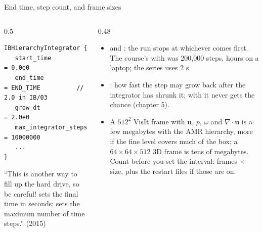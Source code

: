 \documentclass[aspectratio=169,11pt]{beamer}
\begin{document}
\begin{frame}[fragile]{End time, step count, and frame sizes}
\label{fr:outputs2}
\begin{columns}[T,onlytextwidth]
\begin{column}{0.5\textwidth}
\begin{lstlisting}[style=inputtiny]
IBHierarchyIntegrator {
   start_time           = 0.0e0
   end_time             = END_TIME          // 2.0 in IB/03
   grow_dt              = 2.0e0
   max_integrator_steps = 10000000
   ...
}
\end{lstlisting}
\footnotesize ``This is another way to fill up the hard drive, so be careful!  sets the final time in seconds;  sets the maximum number of time steps.'' (2015)
\end{column}
\begin{column}{0.48\textwidth}
\small
\begin{itemize}
  \item {} and : the run stops at whichever comes first. The course's  with  was 200,000 steps, hours on a laptop; the series uses 2 s.
  \item {}: how fast the step may grow back after the integrator has shrunk it; with  it never gets the chance (chapter 5).
  \item A $512^2$ VisIt frame with $\mathbf{u}$, $p$, $\omega$ and $\nabla\cdot\mathbf{u}$ is a few megabytes with the AMR hierarchy, more if the fine level covers much of the box; a $64\times64\times512$ 3D frame is tens of megabytes. Count before you set the interval: frames $\times$ size, plus the restart files if those are on.
\end{itemize}
\end{column}
\end{columns}
\end{frame}
\end{document}

